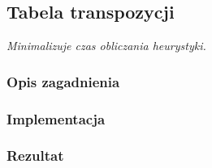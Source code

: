 \subsection{Tabela transpozycji}
\label{subsec:tabela-transpozycji}
\textit{Minimalizuje czas obliczania heurystyki.}


\subsubsection{Opis zagadnienia}
\subsubsection{Implementacja}
\subsubsection{Rezultat}